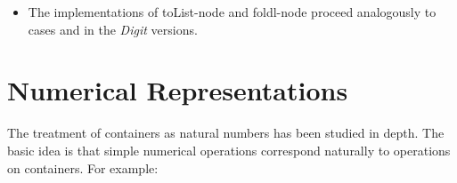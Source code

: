 \documentclass[12pt,twoside,notitlepage]{report}
\begin{document}
\begin{itemize}
\begin{code}
\> \AgdaSymbol{:}  \AgdaSymbol{\{}\AgdaSymbol{\}} \AgdaSymbol{\{} \AgdaSymbol{:}  \AgdaSymbol{\}} \AgdaSymbol{\{} \AgdaSymbol{:}  \AgdaSymbol{\}}\<%
\\
\>[2]\<[6]%
\>[6] \AgdaSymbol{(}    \AgdaSymbol{)}       \<%
\\
\>   \AgdaSymbol{(} \AgdaSymbol{)} \AgdaSymbol{=}   \<%
\\
\>   \AgdaSymbol{(}  \AgdaSymbol{)} \AgdaSymbol{=}  \AgdaSymbol{(}  \AgdaSymbol{)} \<%
\\
\>   \AgdaSymbol{(}   \AgdaSymbol{)} \AgdaSymbol{=}  \AgdaSymbol{(} \AgdaSymbol{(}  \AgdaSymbol{)} \AgdaSymbol{)} \<%
\\
\>   \AgdaSymbol{(}    \AgdaSymbol{)} \AgdaSymbol{=}  \AgdaSymbol{(} \AgdaSymbol{(} \AgdaSymbol{(}  \AgdaSymbol{)} \AgdaSymbol{)} \AgdaSymbol{)} \<%
\\
%
\end{code}

\item The implementations of toList-node and foldl-node proceed analogously to cases  and  in the \textit{Digit} versions.
\end{itemize}

\section{Numerical Representations}
\label{app:numrep}
The treatment of containers as natural numbers has been studied in depth\cite{okasaki}. The basic idea is that simple numerical operations correspond naturally to operations on containers. For example:
\end{document}
